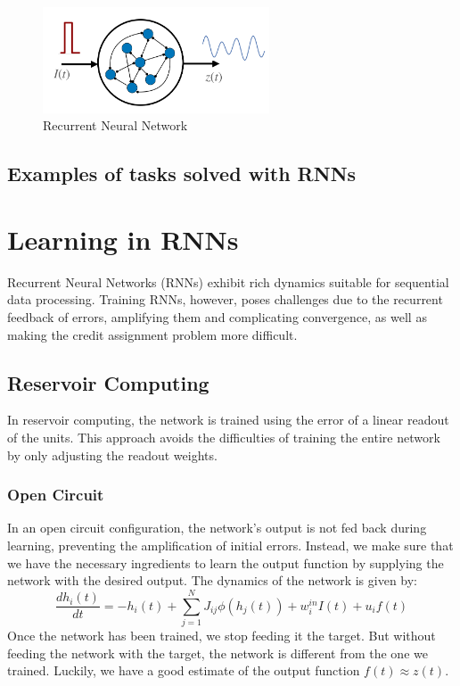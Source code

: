 \documentclass[11pt]{book} %
\begin{document}
\begin{figure}
    \centering
    \includegraphics[width=0.6\textwidth]{Figs/RNN.jpeg}
    \caption{Recurrent Neural Network}
    \label{fig:rnn}
\end{figure}

\subsection{Examples of tasks solved with RNNs}

\section{Learning in RNNs}

Recurrent Neural Networks (RNNs) exhibit rich dynamics suitable for sequential data processing. 
Training RNNs, however, poses challenges due to the recurrent feedback of errors, amplifying them and complicating convergence, 
as well as making the credit assignment problem more difficult.

\subsection{Reservoir Computing}
In reservoir computing, the network is trained using the error of a linear readout of the units. 
This approach avoids the difficulties of training the entire network by only adjusting the readout weights.

\subsubsection{Open Circuit}
In an open circuit configuration, the network's output is not fed back during learning, preventing the amplification of initial errors. 
Instead, we make sure that we have the necessary ingredients to learn the output function by supplying the network with the desired output.
The dynamics of the network is given by:
\[
    \frac{dh_i(t)}{dt} = -h_i(t) + \sum_{j=1}^N J_{ij} \phi(h_j(t)) + w_i^{in} I(t) + u_i f(t)
\]
Once the network has been trained, we stop feeding it the target.
But without feeding the network with the target, the network is different from the one we trained.
Luckily, we have a good estimate of the output function $f(t) \approx z(t)$.
\end{document}

